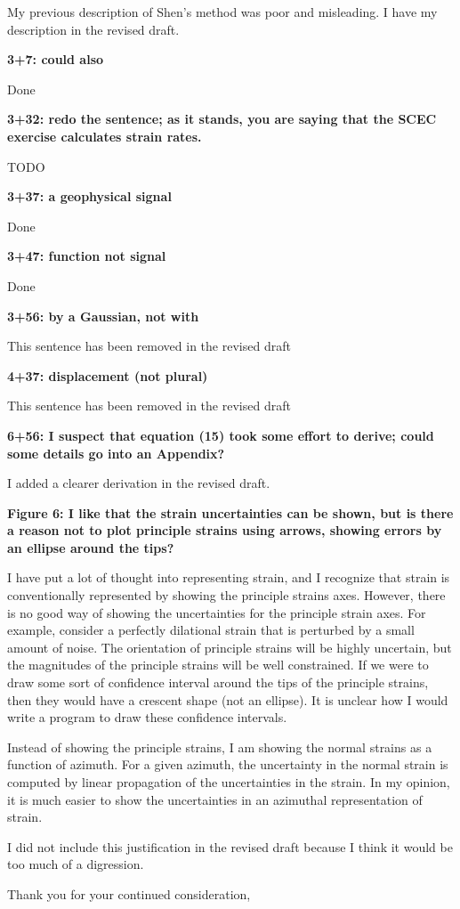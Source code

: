 \documentclass[10pt,a4paper]{letter}
\begin{document}
\begin{letter}{}
My previous description of Shen's method was poor and misleading. I
have my description in the revised draft.

\textbf{3+7: could also}

Done 

\textbf{3+32: redo the sentence; as it stands, you are saying that the SCEC
exercise calculates strain rates.}

TODO

\textbf{3+37: a geophysical signal}

Done

\textbf{3+47: function not signal}

Done

\textbf{3+56: by a Gaussian, not with}

This sentence has been removed in the revised draft

\textbf{4+37: displacement (not plural)}

This sentence has been removed in the revised draft

\textbf{6+56: I suspect that equation (15) took some effort to derive; could
some details go into an Appendix?}

I added a clearer derivation in the revised draft.

\textbf{Figure 6: I like that the strain uncertainties can be shown, but is
there a reason not to plot principle strains using arrows, showing
errors by an ellipse around the tips?}

I have put a lot of thought into representing strain, and I recognize
that strain is conventionally represented by showing the principle
strains axes. However, there is no good way of showing the
uncertainties for the principle strain axes. For example, consider a
perfectly dilational strain that is perturbed by a small amount of
noise. The orientation of principle strains will be highly uncertain,
but the magnitudes of the principle strains will be well constrained.
If we were to draw some sort of confidence interval around the tips of
the principle strains, then they would have a crescent shape (not an
ellipse). It is unclear how I would write a program to draw these
confidence intervals.

Instead of showing the principle strains, I am showing the normal
strains as a function of azimuth. For a given azimuth, the uncertainty
in the normal strain is computed by linear propagation of the
uncertainties in the strain. In my opinion, it is much easier to show
the uncertainties in an azimuthal representation of strain.

I did not include this justification in the revised draft because I
think it would be too much of a digression.

\closing{Thank you for your continued consideration,}

\end{letter}
\end{document}

